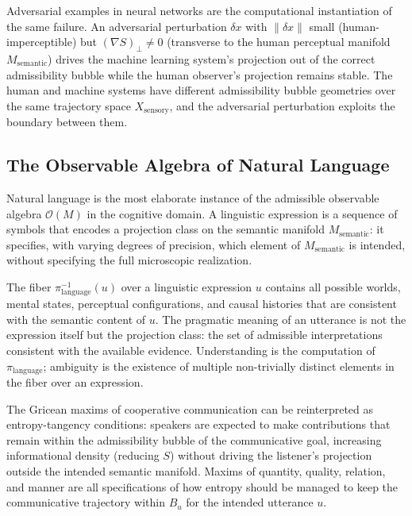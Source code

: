 \documentclass[12pt, a4paper]{article}
\theoremstyle{essaystyle}
\begin{document}
Adversarial examples in neural networks are the computational instantiation of the
same failure. An adversarial perturbation $\delta x$ with $\|\delta x\|$ small
(human-imperceptible) but $(\nabla S)_\perp \neq 0$ (transverse to the human
perceptual manifold $M_{\mathrm{semantic}}$) drives the machine learning system's
projection out of the correct admissibility bubble while the human observer's
projection remains stable. The human and machine systems have different admissibility
bubble geometries over the same trajectory space $X_{\mathrm{sensory}}$, and the
adversarial perturbation exploits the boundary between them.

\subsection{The Observable Algebra of Natural Language}

Natural language is the most elaborate instance of the admissible observable algebra
$\mathcal{O}(M)$ in the cognitive domain. A linguistic expression is a sequence of
symbols that encodes a projection class on the semantic manifold $M_{\mathrm{semantic}}$:
it specifies, with varying degrees of precision, which element of $M_{\mathrm{semantic}}$
is intended, without specifying the full microscopic realization.

The fiber $\pi_{\mathrm{language}}^{-1}(u)$ over a linguistic expression $u$ contains
all possible worlds, mental states, perceptual configurations, and causal histories
that are consistent with the semantic content of $u$. The pragmatic meaning of an
utterance is not the expression itself but the projection class: the set of
admissible interpretations consistent with the available evidence. Understanding is
the computation of $\pi_{\mathrm{language}}$; ambiguity is the existence of multiple
non-trivially distinct elements in the fiber over an expression.

The Gricean maxims of cooperative communication can be reinterpreted as
entropy-tangency conditions: speakers are expected to make contributions that remain
within the admissibility bubble of the communicative goal, increasing informational
density (reducing $S$) without driving the listener's projection outside the intended
semantic manifold. Maxims of quantity, quality, relation, and manner are all
specifications of how entropy should be managed to keep the communicative trajectory
within $B_u$ for the intended utterance $u$.

\end{document}
